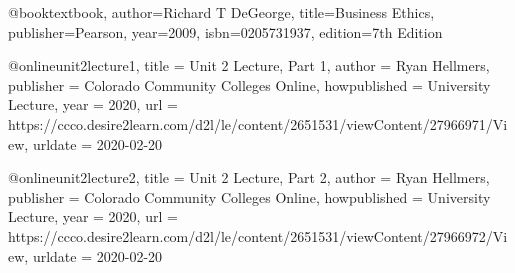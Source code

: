 
@book{textbook,
  author={Richard T DeGeorge},
  title={Business Ethics},
  publisher={Pearson},
  year={2009},
  isbn={0205731937},
  edition={7th Edition}
}

@online{unit2lecture1,
  title        = {Unit 2 Lecture, Part 1},
  author       = {Ryan Hellmers},
  publisher    = {Colorado Community Colleges Online},
  howpublished = {University Lecture},
  year         = {2020},
  url          = {https://ccco.desire2learn.com/d2l/le/content/2651531/viewContent/27966971/View},
  urldate      = {2020-02-20}
}

@online{unit2lecture2,
  title        = {Unit 2 Lecture, Part 2},
  author       = {Ryan Hellmers},
  publisher    = {Colorado Community Colleges Online},
  howpublished = {University Lecture},
  year         = {2020},
  url          = {https://ccco.desire2learn.com/d2l/le/content/2651531/viewContent/27966972/View},
  urldate      = {2020-02-20}
}
